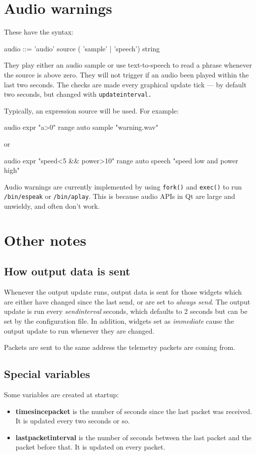\section{Audio warnings}
These have the syntax:
\begin{v}
audio       ::= 'audio' source ( 'sample' | 'speech') string
\end{v}
They play either an audio sample or use text-to-speech to read a phrase whenever the source is above zero.
They will not trigger if an audio been played within the last two seconds. The checks are made every graphical
update tick --- by default two seconds, but changed with \texttt{updateinterval.} 

Typically, an expression source will be used. For example:
\begin{v}
    audio expr "a>0" range auto sample "warning.wav"
\end{v}
or 
\begin{v}
    audio expr "speed<5 && power>10" range auto speech "speed low and power high"
\end{v}
Audio warnings are currently implemented by using \verb+fork()+ and \verb+exec()+ 
to run \verb+/bin/espeak+ or \verb+/bin/aplay+. This is because audio APIs
in Qt are large and unwieldy, and often don't work.




\section{Other notes}

\subsection{How output data is sent}
\label{subhowout}
Whenever the output update runs, output data is sent for those widgets which
are either have changed since the last send, or are set to \emph{always send}.
The output update is run every \emph{sendinterval} seconds, which defaults to
2 seconds but can be set by the configuration file. In addition, widgets set
as \emph{immediate} cause the output update to run whenever they are changed.

Packets are sent to the same address the telemetry packets are coming from.


\subsection{Special variables}
Some variables are created at startup:
\begin{itemize}
\item \textbf{timesincepacket} is the number of seconds since the last packet
was received. It is updated every two seconds or so.
\item \textbf{lastpacketinterval} is the number of seconds between the last
packet and the packet before that. It is updated on every packet.
\end{itemize}

